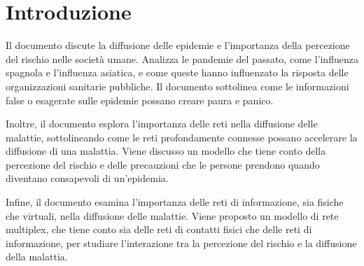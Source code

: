 \section{Introduzione}\label{sec:introduzione}
    Il documento discute la diffusione delle epidemie e l'importanza della percezione del rischio nelle società umane.
    Analizza le pandemie del passato, come l'influenza spagnola e l'influenza asiatica, e come queste hanno influenzato
    la risposta delle organizzazioni sanitarie pubbliche.
    Il documento sottolinea come le informazioni false o esagerate sulle epidemie possano creare paura e panico.

    Inoltre, il documento esplora l'importanza delle reti nella diffusione delle malattie, sottolineando come le reti
    profondamente connesse possano accelerare la diffusione di una malattia.
    Viene discusso un modello che tiene conto della percezione del rischio e delle precauzioni che le persone prendono
    quando diventano consapevoli di un'epidemia.

    Infine, il documento esamina l'importanza delle reti di informazione, sia fisiche che virtuali, nella diffusione
    delle malattie.
    Viene proposto un modello di rete multiplex, che tiene conto sia delle reti di contatti fisici che delle reti di
    informazione, per studiare l'interazione tra la percezione del rischio e la diffusione della malattia.